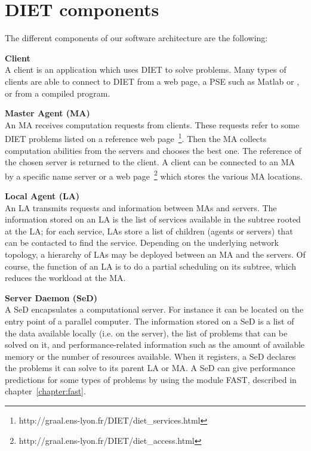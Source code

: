 \section{DIET components}
\label{sec:components}

The different components of our software architecture are the following:      

\begin{description}
\item \textbf{Client}\\
  A client is an application which uses DIET to solve problems.  Many
  types of clients are able to connect to DIET from a web page, a PSE
  such as Matlab or \sci, or from a compiled program.
\item \textbf{Master Agent (MA)}\\
  An MA receives computation requests from clients. These requests
  refer to some DIET problems listed on a reference web
  page~\footnote{http://graal.ens-lyon.fr/DIET/diet\_services.html}.
  Then the MA collects computation abilities from the servers and
  chooses the best one. The reference of the chosen server is returned
  to the client. A client can be connected to an MA by a specific name
  server or a web
  page~\footnote{http://graal.ens-lyon.fr/DIET/diet\_access.html}
  which stores the various MA locations.

\item \textbf{Local Agent (LA)}\\
  An LA transmits requests and information between MAs and servers.
  The information stored on an LA is the list of services available
  in the subtree rooted at the LA; for each service, LAs store a
  list of children (agents or servers) that can be contacted to find
  the service. Depending on the underlying
  network topology, a hierarchy of LAs may be deployed between an MA
  and the servers. Of course, the function of an LA is to do a partial
  scheduling on its subtree, which reduces the workload at the MA.

\item \textbf{Server Daemon (SeD)}\\
  A SeD encapsulates a computational server. For instance it can be
  located on the entry point of a parallel computer. The information
  stored on a SeD is a list of the data available locally (i.e. on
  the server), the list of problems
  that can be solved on it, and performance-related information such
  as the amount of available memory or the number of resources
  available. When it registers, a SeD declares the problems it can
  solve to its parent LA or MA.  A SeD can give performance
  predictions for some types of problems by using the module FAST,
  described in chapter~\ref{chapter:fast}.

\end{description}

